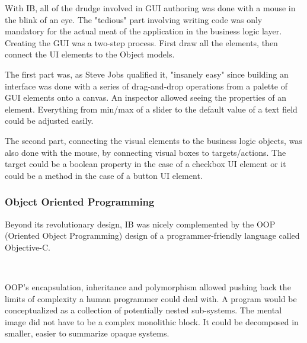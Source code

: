 \vspace{-4mm}
With IB, all of the drudge involved in GUI authoring was done with a mouse in the blink of an eye. The "tedious" part involving writing code was only mandatory for the actual meat of the application in the business logic layer. Creating the GUI was a two-step process. First draw all the elements, then connect the UI elements to the Object models.\\
\par
The first part was, as Steve Jobs qualified it, "insanely easy" since building an interface was done with a series of drag-and-drop operations from a palette of GUI elements onto a canvas. An inspector allowed seeing the properties of an element. Everything from min/max of a slider to the default value of a text field could be adjusted easily.\\
\par
The second part, connecting the visual elements to the business logic objects, was also done with the mouse, by connecting visual boxes to targets/actions. The target could be a boolean property in the case of a checkbox UI element or it could be a method in the case of a button UI element.

\subsubsection{Object Oriented Programming}
Beyond its revolutionary design, IB was nicely complemented by the OOP (Oriented Object Programming) design of a programmer-friendly language called Objective-C.\\
\par
{}\\
\par
OOP's encapsulation, inheritance and polymorphism allowed pushing back the limits of complexity a human programmer could deal with. A program would be conceptualized as a collection of potentially nested sub-systems. The mental image did not have to be a complex monolithic block. It could be decomposed in smaller, easier to summarize opaque systems.\\

